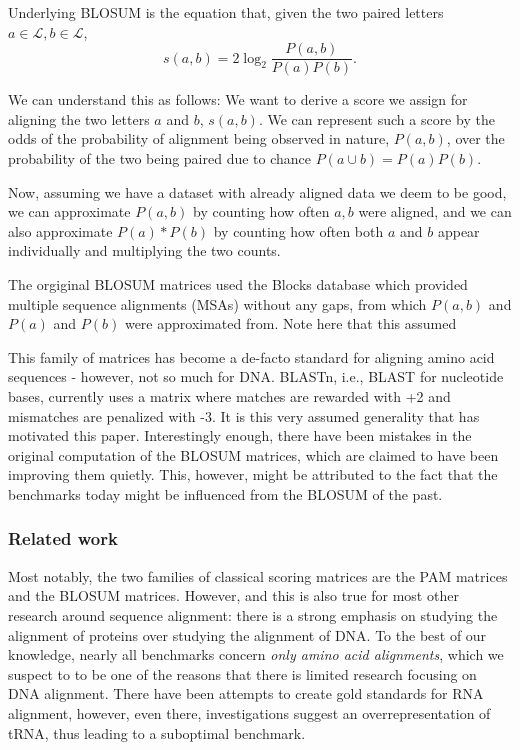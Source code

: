 \documentclass{article}
\begin{document}
\begin{multicols}{2}
Underlying BLOSUM is the equation that, given the two paired letters $a \in
    \mathcal L, b \in \mathcal L$,
\begin{equation*}
    s(a, b)= 2 \log_2 \frac{P(a, b)}{P(a)P(b)}.
\end{equation*}

We can understand this as follows: We want to derive a score we assign
for aligning the two letters $a$ and $b$, $s(a,b)$. We can represent such
a score by the odds of the probability of alignment being observed in nature, $P(a, b)$, over the probability of the two being paired due to chance $P(a \cup b) = P(a)P(b)$.

Now, assuming we have a dataset with already aligned data we deem to be good, we
can approximate $P(a, b)$ by counting how often $a, b$ were aligned, and we can 
also approximate $P(a)*P(b)$ by counting how often both $a$ and $b$ appear 
individually and multiplying the two counts.

The orgiginal BLOSUM matrices used the Blocks database
\cite{henikoffAutomatedAssemblyProtein1991} which provided multiple sequence
alignments (MSAs) without any gaps, from which $P(a, b)$ and $P(a)$ and $P(b)$
were approximated from. Note here that this assumed

This family of matrices has become a de-facto standard for aligning amino acid
sequences - however, not so much for DNA. BLASTn, i.e., BLAST for nucleotide bases, currently uses a matrix where
matches are rewarded with +2 and mismatches are penalized with -3. It is this very assumed generality that has motivated this paper.
Interestingly enough, there have been
mistakes in the original computation of the BLOSUM matrices, which are claimed
to have been improving them quietly. This, however, might be attributed to the
fact that the benchmarks today might be influenced from the BLOSUM of the past.
\subsubsection*{Related work}

Most notably, the two families of classical scoring matrices are the PAM
matrices and the BLOSUM matrices. However, and this is also true for most other
research around sequence alignment: there is a strong emphasis on studying the
alignment of proteins over studying the alignment of DNA. To the best of our
knowledge, nearly all benchmarks concern \emph{only amino acid alignments}, which
we suspect to to be one of the reasons that there is limited research focusing
on DNA alignment. There have been attempts to create gold standards for RNA
alignment,
however, even there, investigations suggest an overrepresentation of tRNA, thus
leading to a suboptimal benchmark.


\end{multicols}
\end{document}

